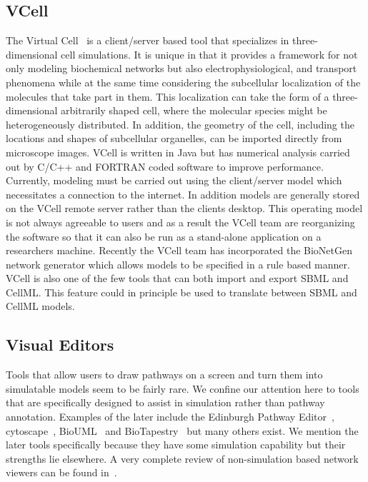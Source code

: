 \documentclass[12pt]{article}
\begin{document}
\subsection{VCell}

The Virtual Cell~\citep[VCell,][]{Schaff:1997,VCell:2002,VCell2003} is
a client/server based tool that specializes in three-dimensional
cell simulations. It is unique in that it provides a framework for
not only modeling biochemical networks but also
electrophysiological, and transport phenomena while at the same time
considering the subcellular localization of the molecules that take
part in them. This localization can take the form of a
three-dimensional arbitrarily shaped cell, where the molecular
species might be heterogeneously distributed. In addition, the
geometry of the cell, including the locations and shapes of
subcellular organelles, can be imported directly from microscope
images. VCell is written in Java but has numerical analysis carried
out by C/C++ and FORTRAN coded software to improve performance.
Currently, modeling must be carried out using the client/server
model which necessitates a connection to the internet. In addition
models are generally stored on the VCell remote server rather than
the clients desktop. This operating model is not always agreeable to
users and as a result the VCell team are reorganizing the software
so that it can also be run as a stand-alone application on a
researchers machine. Recently the VCell team has incorporated the
BioNetGen~\citep{Blinov:2004} network generator which allows models
to be specified in a rule based manner. VCell is also one of the few
tools that can both import and export SBML and CellML. This feature
could in principle be used to translate between SBML and CellML models.

\subsection{Visual Editors}

Tools that allow users to draw pathways on a screen and turn them into simulatable models seem to be fairly rare. We confine our attention here to tools that are specifically designed to assist in simulation rather than pathway annotation. Examples of the later include the Edinburgh Pathway Editor~\citep{EdinPathway:2006}, cytoscape~\citep{Shannon:2003}, BioUML~\citep{kolpakov:2004} and BioTapestry~\citep{longabaugh:2005} but many others exist. We mention the later tools specifically because they have some simulation capability but their strengths lie elsewhere. A very complete review of non-simulation based network viewers can be found in~\citet{Suderman:2007}.
\end{document}
